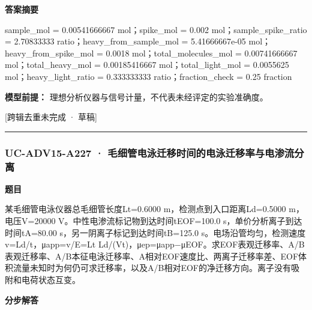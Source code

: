 \documentclass[UTF8,11pt,a4paper]{ctexart}
\begin{document}
\noindent\textbf{答案摘要}\par
sample\_mol = 0.00541666667 mol；spike\_mol = 0.002 mol；sample\_spike\_ratio = 2.70833333 ratio；heavy\_from\_sample\_mol = 5.41666667e-05 mol；heavy\_from\_spike\_mol = 0.0018 mol；total\_molecules\_mol = 0.00741666667 mol；total\_heavy\_mol = 0.00185416667 mol；total\_light\_mol = 0.0055625 mol；heavy\_light\_ratio = 0.333333333 ratio；fraction\_check = 0.25 fraction\par
\noindent\textbf{模型前提：}
理想分析仪器与信号计量，不代表未经评定的实验准确度。\par
\noindent\textcolor{red!65!black}{[跨辑去重未完成 · 草稿]} \par
\medskip\hrule\medskip
{}
\subsubsection*{UC-ADV15-A227 · 毛细管电泳迁移时间的电泳迁移率与电渗流分离}
\noindent\textbf{题目}\par
某毛细管电泳仪器总毛细管长度Lt=0.6000 m，检测点到入口距离Ld=0.5000 m，电压V=20000 V。中性电渗流标记物到达时间tEOF=100.0 s，单价分析离子到达时间tA=80.00 s，另一阴离子标记到达时间tB=125.0 s。电场沿管均匀，检测速度v=Ld/t，μapp=v/E=Lt Ld/(Vt)，μep=μapp−μEOF。求EOF表观迁移率、A/B表观迁移率、A/B本征电泳迁移率、A相对EOF速度比、两离子迁移率差、EOF体积流量未知时为何仍可求迁移率，以及A/B相对EOF的净迁移方向。离子没有吸附和电荷状态互变。\par
\medskip\noindent\textbf{分步解答}
\end{document}
